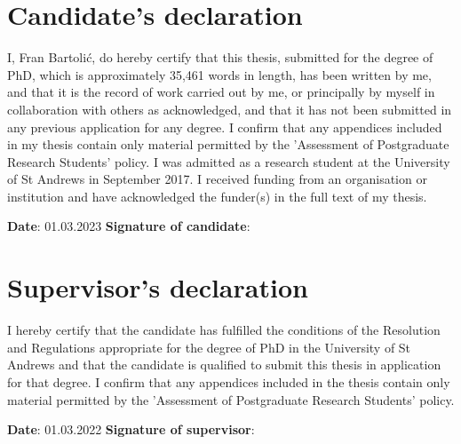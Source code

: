 \documentclass[12pt,dvipsnames]{report}
\begin{document}
\section*{Candidate's declaration}
I, Fran Bartoli\'{c}, do hereby certify that this thesis, submitted for the degree of $\mathrm{PhD}$, which is approximately 35,461 words in length, has been written by me, and that it is the record of work carried out by me, or principally by myself in collaboration with others as acknowledged, and that it has not been submitted in any previous application for any degree. I confirm that any appendices included in my thesis contain only material permitted by the 'Assessment of Postgraduate Research Students' policy.
\newline
\newline
\noindent I was admitted as a research student at the University of St Andrews in September 2017.
\newline
\newline
\noindent I received funding from an organisation or institution and have acknowledged the funder(s) in the full text of my thesis.

\vspace{1cm}
\noindent \textbf{Date}: 01.03.2023 \quad\quad \textbf{Signature of candidate}: 

\section*{Supervisor's declaration}
I hereby certify that the candidate has fulfilled the conditions of the Resolution and Regulations appropriate for the degree of $\mathrm{PhD}$ in the University of St Andrews and that the candidate is qualified to submit this thesis in application for that degree. I confirm that any appendices included in the thesis contain only material permitted by the 'Assessment of Postgraduate Research Students' policy.
\vspace{1cm}

\noindent \textbf{Date}: 01.03.2022 \quad\quad \textbf{Signature of supervisor}: 
\end{document}
